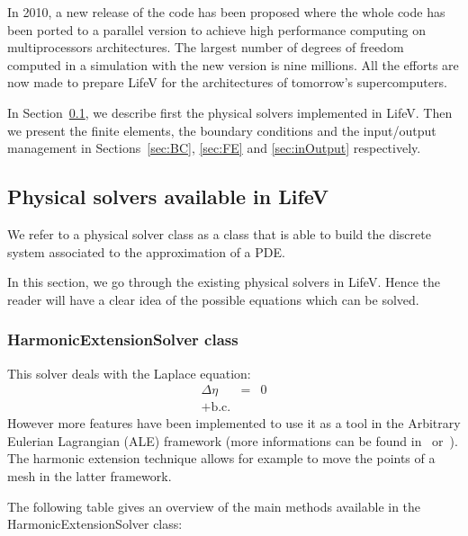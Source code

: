 \documentclass[11pt]{article}
\begin{document}
In 2010, a new release of the code has been proposed where the whole code has been ported to a parallel version to achieve high performance computing on multiprocessors architectures. The largest number of degrees of freedom computed in a simulation with the new version is nine  millions. All the efforts are now made to prepare LifeV for the architectures of tomorrow's supercomputers.

In Section~\ref{sec:solvers}, we describe first the physical solvers implemented in LifeV. Then we present the finite elements, the boundary conditions and the input/output management in Sections~\ref{sec:BC}, \ref{sec:FE} and \ref{sec:inOutput} respectively.

\subsection{Physical solvers available in LifeV}
\label{sec:solvers}
We refer to a physical solver class as a class that is able to build the discrete system associated to the approximation of a PDE.

In this section, we go through the existing physical solvers in LifeV. Hence the reader will have a clear idea of the possible equations which can be solved.

\subsubsection{HarmonicExtensionSolver class}
This solver deals with the Laplace equation:
\begin{eqnarray}
\Delta\eta & = & 0\\
+\text{b.c.}\nonumber
\end{eqnarray}
 However more features have been implemented to use it as a tool in the Arbitrary Eulerian Lagrangian (ALE) framework (more informations can be found in~\cite{nobile} or~\cite{quarteroni}). The harmonic extension technique allows  for example to move the points of a mesh in the latter framework.

The following table gives an overview of the main methods available in the HarmonicExtensionSolver class:
\end{document}
